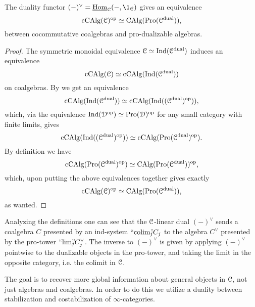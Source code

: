 \begin{lemma}
    \label{ch3:lm:sweedler-duality}
    The duality functor $(-)^\vee = \iHom_\C(-,\1_\C)$ gives an equivalence 
    \[\operatorname{cCAlg}(\EuScript{C})^{\mathrm{op}}\simeq \operatorname{CAlg}(\operatorname{Pro}(\EuScript{C}^{\mathrm{dual}})),\]
    between cocommutative coalgebras and pro-dualizable algebras.
\end{lemma}
\begin{proof}
    The symmetric monoidal equivalence $\EuScript{C}\simeq \operatorname{Ind}(\EuScript{C}^{\mathrm{dual}})$ induces an equivalence 
    \[\operatorname{cCAlg}(\EuScript{C}) \simeq \operatorname{cCAlg}(\operatorname{Ind}(\EuScript{C}^{\mathrm{dual}}))\]
    on coalgebras. By \cite[3.2.4]{lurie_2018_ELL1} we get an equivalence 
    \[\operatorname{cCAlg}(\operatorname{Ind}(\EuScript{C}^{\mathrm{dual}}))\simeq \operatorname{cCAlg}(\operatorname{Ind}((\EuScript{C}^{\mathrm{dual}})^{\mathrm{op}})),\]
    which, via the equivalence $\operatorname{Ind}(\EuScript{D}^{\mathrm{op}})\simeq \operatorname{Pro}(\EuScript{D})^{\mathrm{op}}$ for any small category with finite limits, gives 
    \[\operatorname{cCAlg}(\operatorname{Ind}((\EuScript{C}^{\mathrm{dual}})^{\mathrm{op}}))\simeq \operatorname{cCAlg}(\operatorname{Pro}(\EuScript{C}^{\mathrm{dual}})^{\mathrm{op}}).\]
    By definition we have 
    \[\operatorname{cCAlg}(\operatorname{Pro}(\EuScript{C}^{\mathrm{dual}})^{\mathrm{op}})\simeq \operatorname{CAlg}(\operatorname{Pro}(\EuScript{C}^{\mathrm{dual}}))^{\mathrm{op}},\]
    which, upon putting the above equivalences together gives exactly 
    \[\operatorname{cCAlg}(\EuScript{C})^{\mathrm{op}}\simeq \operatorname{CAlg}(\operatorname{Pro}(\EuScript{C}^{\mathrm{dual}})),\]
    as wanted. 
\end{proof}

\begin{remark}
    \label{ch3:rm:coalebra-in-Ind}
    Analyzing the definitions one can see that the $\EuScript{C}$-linear dual $(-)^\vee$ sends a coalgebra $C$ presented by an ind-system $``\!\operatorname{colim}\!"_{\hspace{-5pt} j} C_j$ to the algebra $C^\vee$ presented by the pro-tower $``\!\lim\!"_{\hspace{-5pt} j} C_j^\vee$. The inverse to $(-)^\vee$ is given by applying $(-)^\vee$ pointwise to the dualizable objects in the pro-tower, and taking the limit in the opposite category, i.e. the colimit in $\EuScript{C}$. 
\end{remark}

The goal is to recover more global information about general objects in $\EuScript{C}$, not just algebras and coalgebras. In order to do this we utilize a duality between stabilization and costabilization of $\infty$-categories. 

